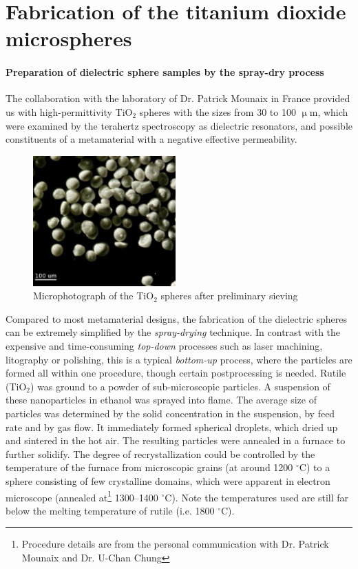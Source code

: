 \section{Fabrication of the titanium dioxide microspheres}
\paragraph{Preparation of dielectric sphere samples by the spray-dry process}%
The collaboration with the laboratory of Dr. Patrick Mounaix in France %
provided us with high-permittivity TiO$_{2}$ spheres with the sizes from 30 to 100 $\upmu$m, which were examined by the terahertz spectroscopy as dielectric resonators, and possible constituents of a metamaterial with a negative effective permeability.
\begin{figure}[ht] \caption{Microphotograph of the TiO$_{2}$ spheres after preliminary sieving} \label{fg_microphoto} \centering 
\includegraphics[height=5cm]{img/microscope_TiO2_particles.pdf}
\end{figure}

Compared to most metamaterial designs, the fabrication of the dielectric spheres can be extremely simplified by the \textit{spray-drying} technique. In contrast with the expensive and time-consuming \textit{top-down} processes such as laser machining, litography or polishing, this is a typical \textit{bottom-up} process, where the particles are formed all within one procedure, though certain postprocessing is needed. 
Rutile (TiO$_{2}$) was ground to a powder of sub-microscopic particles. 
A suspension of these nanoparticles in ethanol was sprayed into flame. The average size of particles was determined by the solid concentration in the suspension, by feed rate and by gas flow. It immediately formed spherical droplets, which dried up and sintered in the hot air.  
The resulting particles were annealed in a furnace to further solidify. The degree of recrystallization could be controlled by the temperature of the furnace from microscopic grains (at around 1200  $^{\circ}$C) to a sphere consisting of few crystalline domains, which were apparent in electron microscope (annealed at\footnote{Procedure details are from the personal communication with Dr. Patrick Mounaix and {Dr.} U-Chan Chung} 1300--1400 $^{\circ}$C). Note the temperatures used are still far below the melting temperature of rutile (i.e. 1800 $^{\circ}$C).

